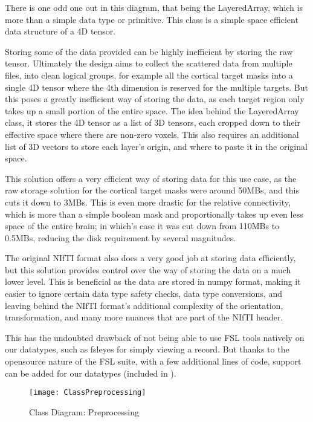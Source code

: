 There is one odd one out in this diagram, that being the LayeredArray, which is more than a simple data type or primitive. This class is a simple space efficient data structure of a 4D tensor.\par
Storing some of the data provided can be highly inefficient by storing the raw tensor. Ultimately the design aims to collect the scattered data from multiple files, into clean logical groups, for example all the cortical target masks into a single 4D tensor where the 4th dimension is reserved for the multiple targets. But this poses a greatly inefficient way of storing the data, as each target region only takes up a small portion of the entire space. The idea behind the LayeredArray class, it stores the 4D tensor as a list of 3D tensors, each cropped down to their effective space where there are non-zero voxels. This also requires an additional list of 3D vectors to store each layer's origin, and where to paste it in the original space.\par
This solution offers a very efficient way of storing data for this use case, as the raw storage solution for the cortical target masks were around 50MBs, and this cuts it down to 3MBs. This is even more drastic for the relative connectivity, which is more than a simple boolean mask and proportionally takes up even less space of the entire brain; in which's case it was cut down from 110MBs to 0.5MBs, reducing the disk requirement by several magnitudes.\par
The original \ac{NIfTI} format also does a very good job at storing data efficiently, but this solution provides control over the way of storing the data on a much lower level. This is beneficial as the data are stored in numpy format, making it easier to ignore certain data type safety checks, data type conversions, and leaving behind the \ac{NIfTI} format's additional complexity of the orientation, transformation, and many more nuances that are part of the \ac{NIfTI} header.\par
This has the undoubted drawback of not being able to use \ac{FSL} tools natively on our datatypes, such as fsleyes for simply viewing a record. But thanks to the opensource nature of the \ac{FSL} suite, with a few additional lines of code, support can be added for our datatypes (included in ).

\begin{figure}[H]
\centering
\texttt{[image: ClassPreprocessing]}
\caption{Class Diagram: Preprocessing}
\end{figure}

